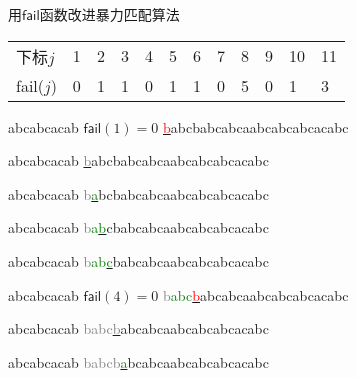 \documentclass{ctexbeamer}
\newcommand{\ul}[1]{\underline{#1}}
\newcommand{\red}[1]{\textcolor{red}{#1}}
\newcommand{\green}[1]{\textcolor{green}{#1}}
\newcommand{\gray}[1]{\textcolor{gray}{#1}}
\newcommand{\str}[1]{\texttt{#1}}
\newcommand{\fail}{\mathsf{fail}}
\newcommand{\ugrn}[1]{\underline{\green{#1}}}
\newcommand{\ured}[1]{\underline{\red{#1}}}
\begin{document}
\begin{frame}[fragile]{用$\fail$函数改进暴力匹配算法}

\begin{table}[]
\begin{tabular}{llllllllllll}
下标$j$ & 1  & 2  & 3 & 4 & 5 & 6 & 7 & 8 & 9 & 10 & 11 \\
fail($j$) & 0  & 1  & 1 & 0 & 1 & 1 & 0 & 5  & 0  & 1 & 3
\end{tabular}
\end{table}

\begin{minipage}[t]{0.33\textwidth}

\begin{tverb}[fontsize=\tiny]
abcabcacab \(\scriptstyle\fail(1)=0\)
\ured{b}abcbabcabcaabcabcabcacabc
\end{tverb}

\begin{tverb}[fontsize=\tiny]
 abcabcacab
\ul{\gray{b}}abcbabcabcaabcabcabcacabc
\end{tverb}

\begin{tverb}[fontsize=\tiny]
 abcabcacab
\gray{b}\ugrn{a}bcbabcabcaabcabcabcacabc
\end{tverb}

\begin{tverb}[fontsize=\tiny]
 abcabcacab
\gray{b}\green{a}\ugrn{b}cbabcabcaabcabcabcacabc
\end{tverb}

\begin{tverb}[fontsize=\tiny]
 abcabcacab
\gray{b}\green{ab}\ugrn{c}babcabcaabcabcabcacabc
\end{tverb}

\begin{tverb}[fontsize=\tiny]
 abcabcacab \(\scriptstyle\fail(4)=0\)
\gray{b}\green{abc}\ul{\red{b}}abcabcaabcabcabcacabc
\end{tverb}

\begin{tverb}[fontsize=\tiny]
     abcabcacab
\gray{babc}\ul{\gray{b}}abcabcaabcabcabcacabc
\end{tverb}

\begin{tverb}[fontsize=\tiny]
     abcabcacab
\gray{babcb}\ugrn{a}bcabcaabcabcabcacabc
\end{tverb}


\end{minipage}
\end{frame}
\end{document}
